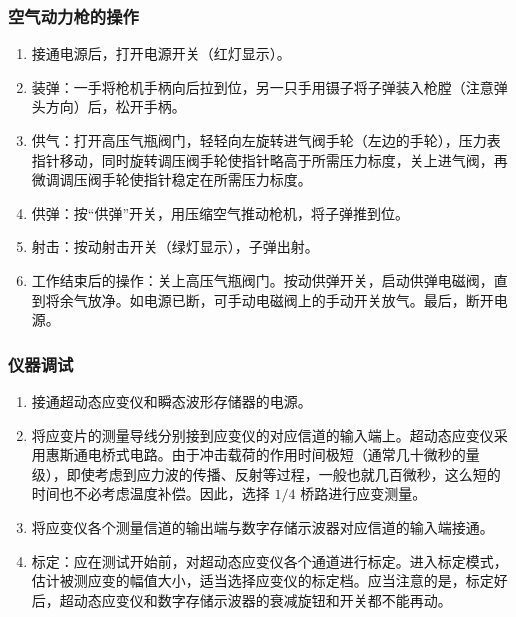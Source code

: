 \documentclass[UTF8,a4paper,12pt]{ctexart}
\numberwithin{equation}{section}
\begin{document}
\subsubsection{空气动力枪的操作}
\begin{enumerate}
  \item 接通电源后，打开电源开关（红灯显示）。
  \item 装弹：一手将枪机手柄向后拉到位，另一只手用镊子将子弹装入枪膛（注意弹头方向）后，松开手柄。
  \item 供气：打开高压气瓶阀门，轻轻向左旋转进气阀手轮（左边的手轮），压力表指针移动，同时旋转调压阀手轮使指针略高于所需压力标度，关上进气阀，再微调调压阀手轮使指针稳定在所需压力标度。
  \item 供弹：按“供弹”开关，用压缩空气推动枪机，将子弹推到位。
  \item 射击：按动射击开关（绿灯显示），子弹出射。
  \item 工作结束后的操作：关上高压气瓶阀门。按动供弹开关，启动供弹电磁阀，直到将余气放净。如电源已断，可手动电磁阀上的手动开关放气。最后，断开电源。
\end{enumerate}

\subsubsection{仪器调试}
\begin{enumerate}
  \item 接通超动态应变仪和瞬态波形存储器的电源。
  \item 将应变片的测量导线分别接到应变仪的对应信道的输入端上。超动态应变仪采用惠斯通电桥式电路。由于冲击载荷的作用时间极短（通常几十微秒的量级），即使考虑到应力波的传播、反射等过程，一般也就几百微秒，这么短的时间也不必考虑温度补偿。因此，选择 $1/4$ 桥路进行应变测量。
  \item 将应变仪各个测量信道的输出端与数字存储示波器对应信道的输入端接通。
  \item 标定：应在测试开始前，对超动态应变仪各个通道进行标定。进入标定模式，估计被测应变的幅值大小，适当选择应变仪的标定档。应当注意的是，标定好后，超动态应变仪和数字存储示波器的衰减旋钮和开关都不能再动。
\end{enumerate}
\end{document}
